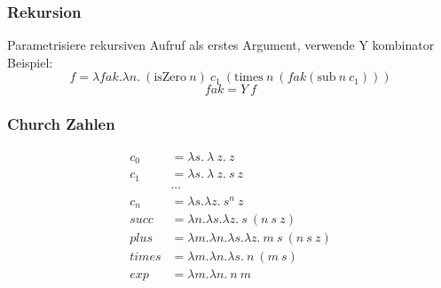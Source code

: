 \subsubsection{Rekursion}
Parametrisiere rekursiven Aufruf als erstes Argument, verwende Y kombinator\\
Beispiel:\\
$$f = \lambda fak. \lambda n. \medspace (\text{isZero}\medspace n)  \medspace c_1 \medspace (\text{times} \medspace n \medspace (fak (\text{sub}\medspace n \medspace c_1)))$$
$$fak = Y \medspace f$$

\subsubsection{Church Zahlen}
\begin{align*}
c_0 &= \lambda s.\ \lambda\ z.\ z\\
c_1 &= \lambda s.\ \lambda\ z.\ s\ z\\
& \cdots \\
c_n &= \lambda s. \lambda z.\ s^n\ z\\
succ &= \lambda n. \lambda s. \lambda z.\ s\ (n\ s\ z)\\
plus &= \lambda m. \lambda n. \lambda s. \lambda z.\ m\ s\ (n\ s\ z)\\
times &= \lambda m. \lambda n. \lambda s.\ n\ (m\ s)\\
exp &= \lambda m. \lambda n.\ n\ m\\
\end{align*}

